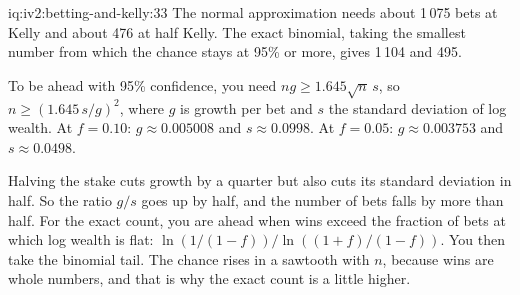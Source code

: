 \begin{solution}{iq:iv2:betting-and-kelly:33}
The normal approximation needs about 1\,075 bets at Kelly and about 476 at half Kelly. The exact binomial, taking the smallest number from which the chance stays at 95\% or more, gives 1\,104 and 495.

To be ahead with 95\% confidence, you need $n g \geq 1.645\sqrt n\,s$, so $n \geq (1.645\,s/g)^2$, where $g$ is growth per bet and $s$ the standard deviation of log wealth. At $f = 0.10$: $g \approx 0.005008$ and $s \approx 0.0998$. At $f = 0.05$: $g \approx 0.003753$ and $s \approx 0.0498$.

Halving the stake cuts growth by a quarter but also cuts its standard deviation in half. So the ratio $g/s$ goes up by half, and the number of bets falls by more than half. For the exact count, you are ahead when wins exceed the fraction of bets at which log wealth is flat: $\ln(1/(1 - f))/\ln((1 + f)/(1 - f))$. You then take the binomial tail. The chance rises in a sawtooth with $n$, because wins are whole numbers, and that is why the exact count is a little higher.

\end{solution}

